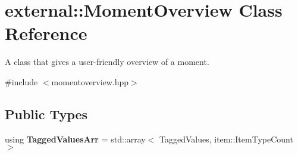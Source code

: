 \hypertarget{classexternal_1_1_moment_overview}{}\section{external\+:\+:Moment\+Overview Class Reference}
\label{classexternal_1_1_moment_overview}


A class that gives a user-\/friendly overview of a moment.  




{\ttfamily \#include $<$momentoverview.\+hpp$>$}

\subsection*{Public Types}
\begin{DoxyCompactItemize}
\item 
\mbox{\label{classexternal_1_1_moment_overview_a7a270c8af32c575c6ec85888c1e9a877}} 
using {\bfseries Tagged\+Values\+Arr} = std\+::array$<$ Tagged\+Values, item\+::\+Item\+Type\+Count $>$
\end{DoxyCompactItemize}
